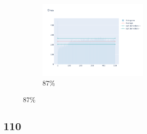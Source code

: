 \documentclass[12pt, fleqn]{report}                             %
\theoremstyle{break}                                            %
\begin{document}
\begin{figure}[ht!]
\begin{subfigure}[b]{0.4\linewidth}
          \includegraphics[width=0.6\textwidth]{Images/106/dia-d.png}
          \caption{87\%}
        \end{subfigure}
      \end{figure}


      \clearpage
      \subsection{110}
\end{document}
